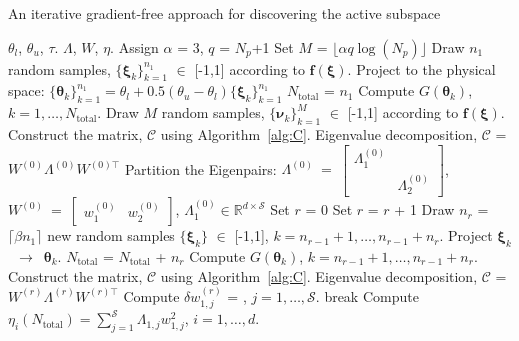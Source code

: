 \bigskip
\begin{breakablealgorithm}
\renewcommand{\algorithmicrequire}{\textbf{Input:}}
\renewcommand{\algorithmicensure}{\textbf{Output:}}
  \caption{An iterative gradient-free approach for discovering the active subspace}
  \begin{algorithmic}[1]
\Require $\theta_l$, $\theta_u$, $\tau$. 
\Ensure $\Lambda$, $W$, $\eta$. 
	\State Assign $\alpha$ = 3, $q$ = $N_p$+1
	\State Set $M$ = $\lfloor\alpha q\log(N_p)\rfloor$
	\State Draw $n_1$ random samples, $\{\bm{\xi}_k\}_{k=1}^{n_1}$ $\in$ [-1,1]
         according to $\bm{f(\xi)}$.
	\State Project to the physical space:
        $\{\bm{\theta}_k\}_{k=1}^{n_1}=\theta_l+0.5(\theta_u-\theta_l)\{\bm{\xi}_k\}_{k=1}^{n_1}$
	\State $N_\text{total}$ = $n_1$ 
	\State Compute $G(\bm\theta_k)$, $k=1, \ldots, N_\text{total}$.
	\State Draw $M$ random samples, $\{\bm{\nu}_k\}_{k=1}^{M}$ $\in$ [-1,1]
         according to $\bm{f(\xi)}$.
	\State Construct the matrix, $\mathcal{C}$ using Algorithm~\ref{alg:C}.
	\State Eigenvalue decomposition, $\mathcal{C}$ = $W^{(0)}\Lambda^{(0)} W^{(0)\top}$
	\State Partition the Eigenpairs: $\Lambda^{(0)}~=~ 
        \begin{bmatrix} \Lambda_1^{(0)} & \\ & \Lambda_2^{(0)} \end{bmatrix}$, 
        $W^{(0)}~=~\begin{bmatrix} w_1^{(0)} & w_2^{(0)} \end{bmatrix}$, 
        $\Lambda_1^{(0)}\in \mathbb{R}^{d\times\mathcal{S}}$
	\State Set $r$ = 0
	\Loop
		\State Set $r$ = $r$ + 1
		\State Draw $n_r$ = $\lceil \beta n_1 \rceil$ new random samples 
                $\{\bm{\xi}_k\}$ $\in$ [-1,1], $k = n_{r-1}+1,\ldots,n_{r-1}+n_r$.
		\State Project $\bm{\xi}_k$~$\rightarrow$~$\bm{\theta}_k$.
		\State $N_\text{total}$ = $N_\text{total}$ + $n_r$ 
		\State Compute $G(\bm\theta_k)$, $k=n_{r-1}+1, \ldots, n_{r-1}+n_r$.  
		\State Construct the matrix, $\mathcal{C}$ using Algorithm~\ref{alg:C}.
		\State Eigenvalue decomposition, $\mathcal{C}$ = $W^{(r)}\Lambda^{(r)} W^{(r)\top}$
		\State Compute $\delta w_{1,j}^{(r)}$ = 
                       , 
                       $j = 1,\ldots,\mathcal{S}$.
			\State break
		\EndIf
	\EndLoop
	\State Compute $\eta_i(N_\text{total}) = \sum\limits_{j=1}^{\mathcal{S}} \Lambda_{1,j}w_{1,j}^2$,
	$i=1,\ldots,d$.
    \EndProcedure
  \end{algorithmic}
  \label{alg:free}
\end{breakablealgorithm}
\bigskip

